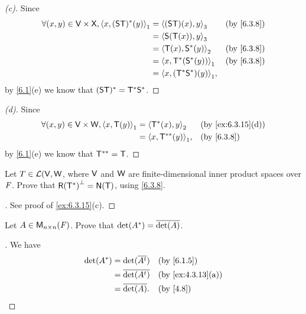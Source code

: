 \begin{proof}[(c)]
  Since
  \begin{align*}
    \forall (x, y) \in \V \times \vs{X}, \inn{x, (\lt{S} \T)^*(y)}_1 & = \inn{(\lt{S} \T)(x), y}_3      &  & \by{6.3.8} \\
                                                                     & = \inn{\lt{S}(\T(x)), y}_3                       \\
                                                                     & = \inn{\T(x), \lt{S}^*(y)}_2     &  & \by{6.3.8} \\
                                                                     & = \inn{x, \T^*(\lt{S}^*(y))}_1   &  & \by{6.3.8} \\
                                                                     & = \inn{x, (\T^* \lt{S}^*)(y)}_1,
  \end{align*}
  by \cref{6.1}(e) we know that \((\mathsf{S} \mathsf{T})^* = \mathsf{T}^* \mathsf{S}^*\).
\end{proof}

\begin{proof}[(d)]
  Since
  \begin{align*}
    \forall (x, y) \in \V \times \W, \inn{x, \T(y)}_1 & = \inn{\T^*(x), y}_2     &  & \by{ex:6.3.15}[d] \\
                                                      & = \inn{x, \T^{**}(y)}_1, &  & \by{6.3.8}
  \end{align*}
  by \cref{6.1}(e) we know that \(\mathsf{T}^{**} = \mathsf{T}\).
\end{proof}

\begin{ex}\label{ex:6.3.17}
  Let \(T \in \mathcal{L}(\mathsf{V}, \mathsf{W}\), where \(\mathsf{V}\) and \(\mathsf{W}\) are finite-dimensional inner product spaces over \(\mathit{F}\).
  Prove that \(\rg{\T^*}^{\perp} = \ns{\T}\), using \cref{6.3.8}.
\end{ex}

\begin{proof}[]
  See proof of \cref{ex:6.3.15}(c).
\end{proof}

\begin{ex}\label{ex:6.3.18}
  Let \(A \in \ms[n][n][\F]\).
  Prove that \(\det(A^*) = \overline{\det(A)}\).
\end{ex}

\begin{proof}[]
  We have
  \begin{align*}
    \det(A^*) & = \det(\conj{\tp{A}}) &  & \by{6.1.5}        \\
              & = \conj{\det(\tp{A})} &  & \by{ex:4.3.13}[a] \\
              & = \conj{\det(A)}.     &  & \by{4.8}
  \end{align*}
\end{proof}

